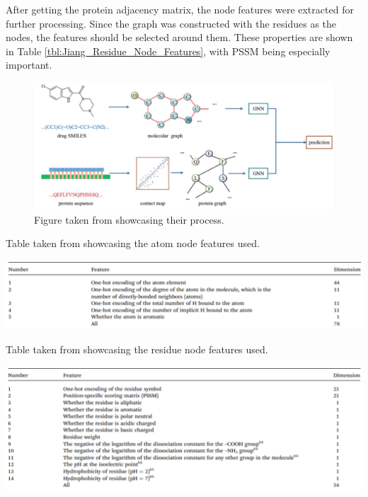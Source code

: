 After getting the protein adjacency matrix, the node features were extracted for further processing. Since the graph was constructed with the residues as the nodes, the features should be selected around them. These properties are shown in Table \ref{tbl:Jiang_Residue_Node_Features}, with PSSM being especially important.

\begin{figure}[!ht]
    \centering
    \includegraphics[width=1.0\linewidth]{images/Jiang_Process.pdf}    
    \caption{Figure taken from \citet{Jiang2020} showcasing their process.}
    \label{fig:Jiang_Process} 
\end{figure}

\begin{table}[!ht]
  \caption{Table taken from \citet{Jiang2020} showcasing the atom node features used.}
  \label{tbl:Jiang_Atom_Node_Features}
  \includegraphics[width=1.0\linewidth]{images/Jiang_Atom_Node_Features.pdf}
\end{table}

\begin{table}[!ht]
  \caption{Table taken from \citet{Jiang2020} showcasing the residue node features used.}
  \label{tbl:Jiang_Residue_Node_Features}
  \includegraphics[width=1.0\linewidth]{images/Jiang_Residue_Node_Features.pdf}
\end{table}

